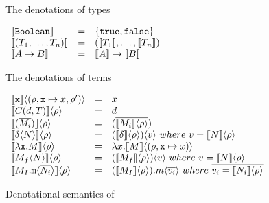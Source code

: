 \begin{figure}[h]

The denotations of \corelang types

\begin{center}
  \(\begin{array}{ l c l }
  \Denot{\lst{Boolean}} & = & \{ \lst{true}, \lst{false} \}  \\	
  \Denot{(T_1,\dots,T_n)} & = & (\Denot{T_1},\dots,\Denot{T_n})  \\	
  \Denot{A \to B} & = & \Denot{A} \to \Denot{B}  \\	
  \end{array}\)
\end{center}

The denotations of \corelang terms

\begin{center}
  \(\begin{array}{ l c l }
  \Apply{ \Denot{\lst{x}}			}{(\rho,\lst{x}\mapsto x, \rho')} & = & x \\	
  \Apply{ \Denot{C(d, T)} 			}{\rho} & = & d \\	
  \Apply{ \Denot{(\Ov{M_i})} 		}{\rho} & = & (\Ov{ \Apply{\Denot{M_i}}{\rho} }) \\	

  \Apply{ \Denot{\Apply{\delta}{N}} }{\rho} & = 
		& \Apply{ (\Apply{\Denot{\delta}}{\rho}) }{ v }~where~v = \Apply{\Denot{N}}{\rho} \\	

  \Apply{ \Denot{\Lam{\lst{x}}{M}}	}{\rho} & = 
		& \Lam{x}{ \Apply{\Denot{M}}{(\rho, \lst{x}\mapsto x)} } \\	

  \Apply{ \Denot{\Apply{M_f}{N}}	}{\rho} & = 
		& \Apply{ (\Apply{\Denot{M_f}}{\rho}) }{ v }~where~v = \Apply{\Denot{N}}{\rho} \\	

  \Apply{ \Denot{ \Apply{M_I.\lst{m}}{\Ov{N_i}} }	}{\rho} & = 
		& \Apply{ (\Apply{\Denot{M_I}}{\rho}).m }{ \Ov{v_i} }~where~\Ov{v_i = \Apply{\Denot{N_i}}{\rho}} \\	
  \end{array}\)
\end{center}

\caption{Denotational semantics of \corelang}
\label{fig:denotations}
\end{figure}